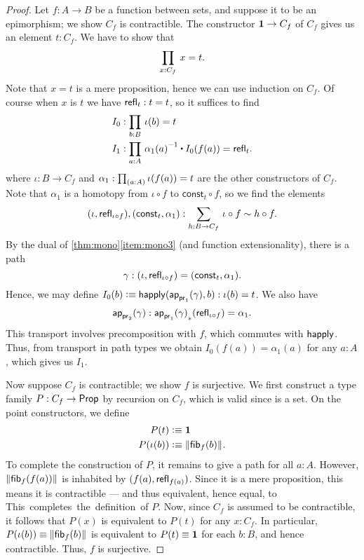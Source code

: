 \begin{proof}
Let $f:A\to B$ be a function between sets, and suppose it to be an epimorphism; we show $C_f$ is contractible.
The constructor $\mathbf{1}\to C_f$ of $C_f$ gives us an element $t:C_f$.
We have to show that
\begin{equation*}
\prd{x:C_f} x= t.
\end{equation*}
Note that $x= t$ is a mere proposition, hence we can use induction on $C_f$.
Of course when $x$ is $t$ we have $\mathsf{refl}_{t}:t=t$, so it suffices to find
\begin{align*}
I_0 & : \prd{b:B} \iota(b)= t\\
I_1 & : \prd{a:A} \opp{\alpha_1(a)} \ct I_0(f(a))=\refl{t}.
\end{align*}
where $\iota:B\to C_f$ and $\alpha_1:\prd{a:A} \iota(f(a))= t$ are the other constructors
of $C_f$. Note that $\alpha_1$ is a homotopy from $\iota\circ f$ to
$\mathsf{const}_t\circ f$, so we find the elements
\begin{equation*}
\pairr{\iota,\refl{\iota\circ f}},\pairr{\mathsf{const}_t,\alpha_1}:
\sm{h:B\to C_f} \iota\circ f \htpy h\circ f.
\end{equation*}
By the dual of \cref{thm:mono}\ref{item:mono3} (and function extensionality), there is a path
\begin{equation*}
\gamma:{\mathopen{}(\iota,\mathsf{refl}_{\iota\circ f})\mathclose{}}={\mathopen{}(\mathsf{const}_t,\alpha_1)\mathclose{}}.
\end{equation*}
Hence, we may define $I_0(b)\vcentcolon\equiv \mathsf{happly}(\mathsf{ap}_{\mathsf{pr}_{1}}(\gamma),b):\iota(b)=t$.
We also have
\[\mathsf{ap}_{\mathsf{pr}_{2}}(\gamma) : {\mathsf{ap}_{\mathsf{pr}_{1}}(\gamma)}_{*}\mathopen{}\left({\mathsf{refl}_{\iota\circ f}}\right)\mathclose{} = \alpha_1. \]
This transport involves precomposition with $f$, which commutes with $\mathsf{happly}$.
Thus, from transport in path types we obtain $I_0(f(a)) = \alpha_1(a)$ for any $a:A$, which gives us $I_1$.

Now suppose $C_f$ is contractible; we show $f$ is surjective.
We first construct a type family $P:C_f\to\mathsf{Prop}$ by recursion on $C_f$, which is valid since \prop is a set.
On the point constructors, we define
\begin{align*}
P(t) & \vcentcolon\equiv \mathbf{1}\\
P(\iota(b)) & \vcentcolon\equiv \mathopen{}\left\Vert {\mathsf{fib}}_{f}(b)\right\Vert_{}\mathclose{}.
\end{align*}
To complete the construction of $P$, it remains to give a path
for all $a:A$.
However, $\mathopen{}\left\Vert {\mathsf{fib}}_{f}(f(a))\right\Vert_{}\mathclose{}$ is inhabited by $(f(a),\mathsf{refl}_{f(a)})$.
Since it is a mere proposition, this means it is contractible --- and thus equivalent, hence equal, to \unit.
This completes the definition of $P$.
Now, since $C_f$ is assumed to be contractible, it follows that $P(x)$ is equivalent to $P(t)$ for any $x:C_f$.
In particular, $P(\iota(b))\equiv \mathopen{}\left\Vert {\mathsf{fib}}_{f}(b)\right\Vert_{}\mathclose{}$ is equivalent to $P(t)\equiv \mathbf{1}$ for each $b:B$, and hence contractible.
Thus, $f$ is surjective.


\end{proof}
